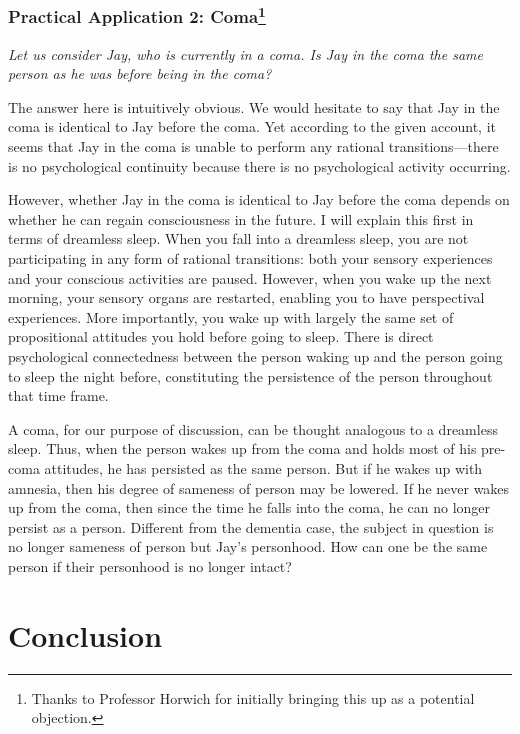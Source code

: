\subsubsection*{Practical Application 2: Coma\footnote{Thanks to Professor Horwich for
  initially bringing this up as a potential objection.}}

\emph{Let us consider Jay, who is currently in a coma. Is Jay in the
coma the same person as he was before being in the coma?}
\vspace{1em}

The answer here is intuitively obvious. We would hesitate to say that
Jay in the coma is identical to Jay before the coma. Yet according to
the given account, it seems that Jay in the coma is unable to perform
any rational transitions---there is no psychological continuity because
there is no psychological activity occurring.

However, whether Jay in the coma is identical to Jay before the coma
depends on whether he can regain consciousness in the future. I will
explain this first in terms of dreamless sleep. When you fall into a
dreamless sleep, you are not participating in any form of rational
transitions: both your sensory experiences and your conscious activities
are paused. However, when you wake up the next morning, your sensory
organs are restarted, enabling you to have perspectival experiences.
More importantly, you wake up with largely the same set of propositional
attitudes you hold before going to sleep. There is direct psychological
connectedness between the person waking up and the person going to sleep
the night before, constituting the persistence of the person throughout
that time frame.

A coma, for our purpose of discussion, can be thought analogous to a
dreamless sleep. Thus, when the person wakes up from the coma and holds
most of his pre-coma attitudes, he has persisted as the same person. But
if he wakes up with amnesia, then his degree of sameness of person may
be lowered. If he never wakes up from the coma, then since the time he
falls into the coma, he can no longer persist as a person. Different
from the dementia case, the subject in question is no longer sameness of
person but Jay's personhood. How can one be the same person if their
personhood is no longer intact?


\section{Conclusion }

